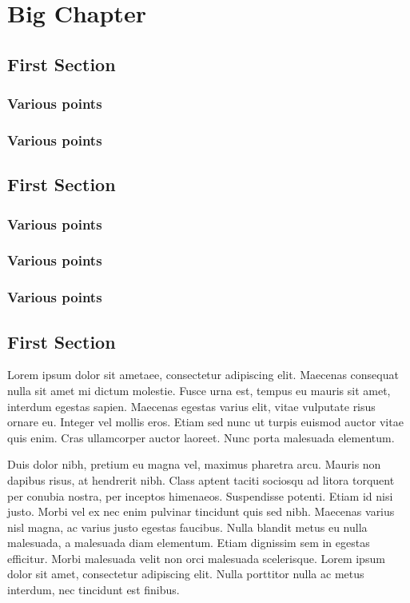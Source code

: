 \documentclass[12pt,a4paper]{article}
\begin{document}
\tableofcontents
\cleardoublepage
\fancyhead{}

\clearpage
\fancyhead[L]{[Part]}
\clearpage
\section{Big Chapter}
\subsection{First Section}
\subsubsection{Various points}
\subsubsection{Various points}
\subsection{First Section}
\subsubsection{Various points}
\subsubsection{Various points}
\subsubsection{Various points}
\subsection{First Section}
Lorem ipsum dolor sit {\color{o-Sun}ametaee}, consectetur adipiscing elit. Maecenas consequat nulla sit amet mi dictum molestie. Fusce urna est, tempus eu mauris sit amet, interdum egestas sapien. Maecenas egestas varius elit, vitae vulputate risus ornare eu. Integer vel mollis eros. Etiam sed nunc ut turpis euismod auctor vitae quis enim. Cras ullamcorper auctor laoreet. Nunc porta malesuada elementum.

Duis dolor nibh, pretium eu magna vel, maximus pharetra arcu. Mauris non dapibus risus, at hendrerit nibh. Class aptent {\color{minor} taciti sociosqu ad litora torquent per conubia nostra, per inceptos himenaeos. Suspendisse potenti. Etiam }id nisi justo. Morbi vel ex nec enim pulvinar tincidunt quis sed nibh. Maecenas varius nisl magna, ac varius justo egestas faucibus. Nulla blandit metus eu nulla malesuada, a malesuada diam elementum. Etiam dignissim sem in egestas efficitur. Morbi malesuada velit non orci malesuada scelerisque. Lorem ipsum dolor sit amet, consectetur adipiscing {\color{minimal} elit. Nulla porttitor nulla ac metus interdum, nec tincidunt est finibus.}
\end{document}
